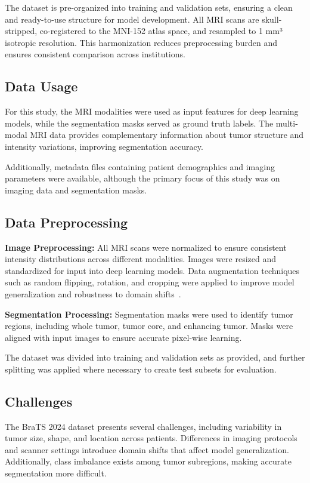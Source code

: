 \documentclass[conference]{IEEEtran}
\begin{document}
The dataset is pre-organized into training and validation sets, ensuring a clean and ready-to-use structure for model development. All MRI scans are skull-stripped, co-registered to the MNI-152 atlas space, and resampled to 1 mm³ isotropic resolution. This harmonization reduces preprocessing burden and ensures consistent comparison across institutions.

\subsection{Data Usage}

For this study, the MRI modalities were used as input features for deep learning models, while the segmentation masks served as ground truth labels. The multi-modal MRI data provides complementary information about tumor structure and intensity variations, improving segmentation accuracy.

Additionally, metadata files containing patient demographics and imaging parameters were available, although the primary focus of this study was on imaging data and segmentation masks.

\subsection{Data Preprocessing}

\textbf{Image Preprocessing:}  
All MRI scans were normalized to ensure consistent intensity distributions across different modalities. Images were resized and standardized for input into deep learning models. Data augmentation techniques such as random flipping, rotation, and cropping were applied to improve model generalization and robustness to domain shifts~\cite{4,15}.

\textbf{Segmentation Processing:}  
Segmentation masks were used to identify tumor regions, including whole tumor, tumor core, and enhancing tumor. Masks were aligned with input images to ensure accurate pixel-wise learning.

The dataset was divided into training and validation sets as provided, and further splitting was applied where necessary to create test subsets for evaluation.

\subsection{Challenges}

The BraTS 2024 dataset presents several challenges, including variability in tumor size, shape, and location across patients. Differences in imaging protocols and scanner settings introduce domain shifts that affect model generalization. Additionally, class imbalance exists among tumor subregions, making accurate segmentation more difficult.
\end{document}
